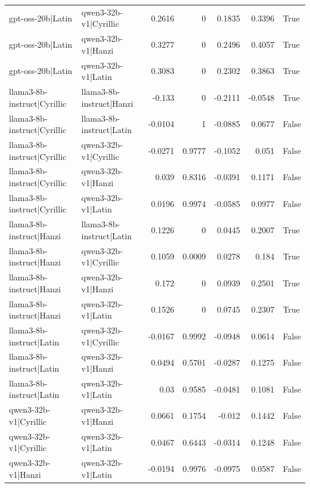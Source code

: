 \begin{table}
\begin{tabular}{l l r r r r l}
gpt-oss-20b|Latin & qwen3-32b-v1|Cyrillic & 0.2616 & 0 & 0.1835 & 0.3396 & True \\
gpt-oss-20b|Latin & qwen3-32b-v1|Hanzi & 0.3277 & 0 & 0.2496 & 0.4057 & True \\
gpt-oss-20b|Latin & qwen3-32b-v1|Latin & 0.3083 & 0 & 0.2302 & 0.3863 & True \\
llama3-8b-instruct|Cyrillic & llama3-8b-instruct|Hanzi & -0.133 & 0 & -0.2111 & -0.0548 & True \\
llama3-8b-instruct|Cyrillic & llama3-8b-instruct|Latin & -0.0104 & 1 & -0.0885 & 0.0677 & False \\
llama3-8b-instruct|Cyrillic & qwen3-32b-v1|Cyrillic & -0.0271 & 0.9777 & -0.1052 & 0.051 & False \\
llama3-8b-instruct|Cyrillic & qwen3-32b-v1|Hanzi & 0.039 & 0.8316 & -0.0391 & 0.1171 & False \\
llama3-8b-instruct|Cyrillic & qwen3-32b-v1|Latin & 0.0196 & 0.9974 & -0.0585 & 0.0977 & False \\
llama3-8b-instruct|Hanzi & llama3-8b-instruct|Latin & 0.1226 & 0 & 0.0445 & 0.2007 & True \\
llama3-8b-instruct|Hanzi & qwen3-32b-v1|Cyrillic & 0.1059 & 0.0009 & 0.0278 & 0.184 & True \\
llama3-8b-instruct|Hanzi & qwen3-32b-v1|Hanzi & 0.172 & 0 & 0.0939 & 0.2501 & True \\
llama3-8b-instruct|Hanzi & qwen3-32b-v1|Latin & 0.1526 & 0 & 0.0745 & 0.2307 & True \\
llama3-8b-instruct|Latin & qwen3-32b-v1|Cyrillic & -0.0167 & 0.9992 & -0.0948 & 0.0614 & False \\
llama3-8b-instruct|Latin & qwen3-32b-v1|Hanzi & 0.0494 & 0.5701 & -0.0287 & 0.1275 & False \\
llama3-8b-instruct|Latin & qwen3-32b-v1|Latin & 0.03 & 0.9585 & -0.0481 & 0.1081 & False \\
qwen3-32b-v1|Cyrillic & qwen3-32b-v1|Hanzi & 0.0661 & 0.1754 & -0.012 & 0.1442 & False \\
qwen3-32b-v1|Cyrillic & qwen3-32b-v1|Latin & 0.0467 & 0.6443 & -0.0314 & 0.1248 & False \\
qwen3-32b-v1|Hanzi & qwen3-32b-v1|Latin & -0.0194 & 0.9976 & -0.0975 & 0.0587 & False \\
\bottomrule
\end{tabular}
\end{table}
